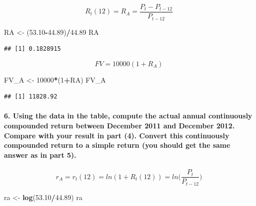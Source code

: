 \documentclass[]{article}
\newenvironment{Shaded}{\begin{snugshade}}{\end{snugshade}}
\newcommand{\KeywordTok}[1]{\textcolor[rgb]{0.13,0.29,0.53}{\textbf{#1}}}
\newcommand{\DecValTok}[1]{\textcolor[rgb]{0.00,0.00,0.81}{#1}}
\newcommand{\FloatTok}[1]{\textcolor[rgb]{0.00,0.00,0.81}{#1}}
\newcommand{\StringTok}[1]{\textcolor[rgb]{0.31,0.60,0.02}{#1}}
\newcommand{\OperatorTok}[1]{\textcolor[rgb]{0.81,0.36,0.00}{\textbf{#1}}}
\newcommand{\NormalTok}[1]{#1}
\let\oldparagraph\paragraph
\renewcommand{\paragraph}[1]{\oldparagraph{#1}\mbox{}}
\begin{document}
\[R_t(12) = R_A = \frac{P_t - P_{t-12}}{P_{t-12}} \]

\begin{Shaded}
\begin{Highlighting}[]
\NormalTok{RA <-}\StringTok{ }\NormalTok{(}\FloatTok{53.10}\OperatorTok{-}\FloatTok{44.89}\NormalTok{)}\OperatorTok{/}\FloatTok{44.89}
\NormalTok{RA}
\end{Highlighting}
\end{Shaded}

\begin{verbatim}
## [1] 0.1828915
\end{verbatim}

\[ FV = 10000(1+R_A)\]

\begin{Shaded}
\begin{Highlighting}[]
\NormalTok{FV_A <-}\StringTok{ }\DecValTok{10000}\OperatorTok{*}\NormalTok{(}\DecValTok{1}\OperatorTok{+}\NormalTok{RA) }
\NormalTok{FV_A}
\end{Highlighting}
\end{Shaded}

\begin{verbatim}
## [1] 11828.92
\end{verbatim}

\paragraph{6. Using the data in the table, compute the actual annual
continuously compounded return between December 2011 and December 2012.
Compare with your result in part (4). Convert this continuously
compounded return to a simple return (you should get the same answer as
in part
5).}\label{using-the-data-in-the-table-compute-the-actual-annual-continuously-compounded-return-between-december-2011-and-december-2012.-compare-with-your-result-in-part-4.-convert-this-continuously-compounded-return-to-a-simple-return-you-should-get-the-same-answer-as-in-part-5.}

\[r_A  = r_t(12) = ln(1+R_t(12)) = ln\Big(\frac{P_t}{P_{t-12}}\Big)\]

\begin{Shaded}
\begin{Highlighting}[]
\NormalTok{ra <-}\StringTok{ }\KeywordTok{log}\NormalTok{(}\FloatTok{53.10}\OperatorTok{/}\FloatTok{44.89}\NormalTok{)}
\NormalTok{ra}
\end{Highlighting}
\end{Shaded}
\end{document}
